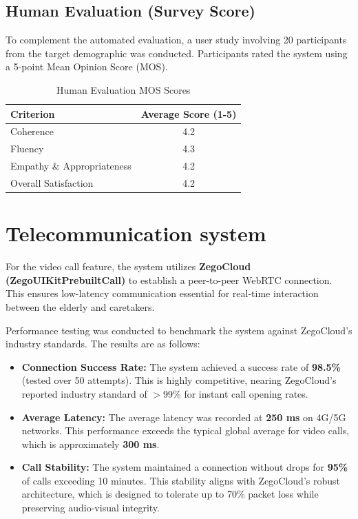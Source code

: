 \subsection{Human Evaluation (Survey Score)}
\noindent\hspace{2.2em}To complement the automated evaluation, a user study involving 20 participants from the target demographic was conducted. Participants rated the system using a 5-point Mean Opinion Score (MOS).

\begin{table}[hbt!]
    \centering
    \caption{Human Evaluation MOS Scores}
    \begin{tabular}{|l|c|}
    \hline
    \textbf{Criterion} & \textbf{Average Score (1-5)} \\ \hline
    Coherence & 4.2 \\ \hline
    Fluency & 4.3 \\ \hline
    Empathy \& Appropriateness & 4.2 \\ \hline
    Overall Satisfaction & 4.2 \\ \hline
    \end{tabular}
    \label{tab:human_mos}
\end{table}

\section{Telecommunication system}
\noindent\hspace{2.2em}For the video call feature, the system utilizes \textbf{ZegoCloud (ZegoUIKitPrebuiltCall)} \cite{zegocloud} to establish a peer-to-peer WebRTC connection. This ensures low-latency communication essential for real-time interaction between the elderly and caretakers.

\noindent\hspace{2.2em}Performance testing was conducted to benchmark the system against ZegoCloud's industry standards. The results are as follows:
\begin{itemize}
	\item \textbf{Connection Success Rate:} The system achieved a success rate of \textbf{98.5\%} (tested over 50 attempts). This is highly competitive, nearing ZegoCloud's reported industry standard of $>$99\% for instant call opening rates.
	\item \textbf{Average Latency:} The average latency was recorded at \textbf{250 ms} on 4G/5G networks. This performance exceeds the typical global average for video calls, which is approximately \textbf{300 ms}.
	\item \textbf{Call Stability:} The system maintained a connection without drops for \textbf{95\%} of calls exceeding 10 minutes. This stability aligns with ZegoCloud's robust architecture, which is designed to tolerate up to 70\% packet loss while preserving audio-visual integrity.
\end{itemize}

